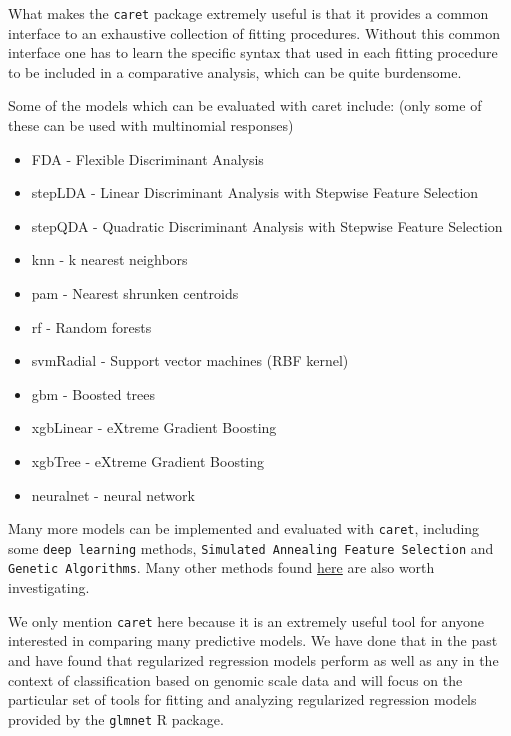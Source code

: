 \documentclass[
]{book}
\providecommand{\tightlist}{%
  \setlength{\itemsep}{0pt}\setlength{\parskip}{0pt}}
\begin{document}
What makes the \texttt{caret} package extremely useful is that it provides a common interface
to an exhaustive collection of fitting procedures. Without
this common interface one has to learn the specific syntax that
used in each fitting procedure to be included in a comparative analysis,
which can be quite burdensome.

Some of the models which can be evaluated with caret include:
(only some of these can be used with multinomial responses)

\begin{itemize}
\tightlist
\item
  FDA - Flexible Discriminant Analysis\\
\item
  stepLDA - Linear Discriminant Analysis with Stepwise Feature Selection\\
\item
  stepQDA - Quadratic Discriminant Analysis with Stepwise Feature Selection\\
\item
  knn - k nearest neighbors\\
\item
  pam - Nearest shrunken centroids\\
\item
  rf - Random forests\\
\item
  svmRadial - Support vector machines (RBF kernel)\\
\item
  gbm - Boosted trees\\
\item
  xgbLinear - eXtreme Gradient Boosting\\
\item
  xgbTree - eXtreme Gradient Boosting\\
\item
  neuralnet - neural network
\end{itemize}

Many more models can be implemented and evaluated with \texttt{caret},
including some \texttt{deep\ learning} methods, \texttt{Simulated\ Annealing\ Feature\ Selection}
and \texttt{Genetic\ Algorithms}.
Many other methods found \href{https://topepo.github.io/caret/available-models.html}{here}
are also worth investigating.

We only mention \texttt{caret} here because it is an extremely useful tool for
anyone interested in comparing many predictive models. We have done that
in the past and have found that regularized regression models perform
as well as any in the context of classification based on genomic scale data
and will focus on the particular set of tools for fitting and analyzing
regularized regression models provided by the \texttt{glmnet} R package.
\end{document}
